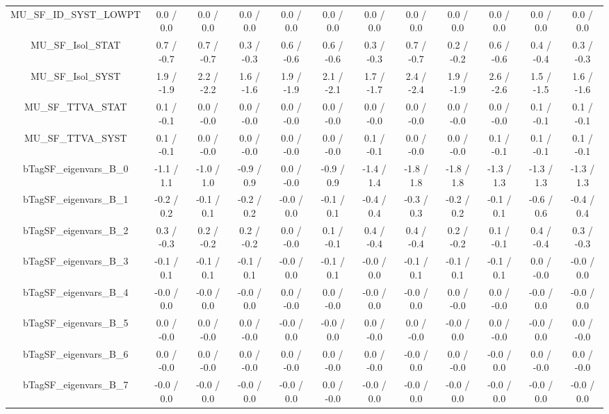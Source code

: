 \begin{table}[htbp]
\begin{center}
\begin{tabular}{|c|c|c|c|c|c|c|c|c|c|c|c|}
  MU_SF_ID_SYST_LOWPT & 0.0 / 0.0 & 0.0 / 0.0 & 0.0 / 0.0 & 0.0 / 0.0 & 0.0 / 0.0 & 0.0 / 0.0 & 0.0 / 0.0 & 0.0 / 0.0 & 0.0 / 0.0 & 0.0 / 0.0 & 0.0 / 0.0 \\ 
  MU_SF_Isol_STAT & 0.7 / -0.7 & 0.7 / -0.7 & 0.3 / -0.3 & 0.6 / -0.6 & 0.6 / -0.6 & 0.3 / -0.3 & 0.7 / -0.7 & 0.2 / -0.2 & 0.6 / -0.6 & 0.4 / -0.4 & 0.3 / -0.3 \\ 
  MU_SF_Isol_SYST & 1.9 / -1.9 & 2.2 / -2.2 & 1.6 / -1.6 & 1.9 / -1.9 & 2.1 / -2.1 & 1.7 / -1.7 & 2.4 / -2.4 & 1.9 / -1.9 & 2.6 / -2.6 & 1.5 / -1.5 & 1.6 / -1.6 \\ 
  MU_SF_TTVA_STAT & 0.1 / -0.1 & 0.0 / -0.0 & 0.0 / -0.0 & 0.0 / -0.0 & 0.0 / -0.0 & 0.0 / -0.0 & 0.0 / -0.0 & 0.0 / -0.0 & 0.0 / -0.0 & 0.1 / -0.1 & 0.1 / -0.1 \\ 
  MU_SF_TTVA_SYST & 0.1 / -0.1 & 0.0 / -0.0 & 0.0 / -0.0 & 0.0 / -0.0 & 0.0 / -0.0 & 0.1 / -0.1 & 0.0 / -0.0 & 0.0 / -0.0 & 0.1 / -0.1 & 0.1 / -0.1 & 0.1 / -0.1 \\ 
  bTagSF_eigenvars_B_0 & -1.1 / 1.1 & -1.0 / 1.0 & -0.9 / 0.9 & 0.0 / -0.0 & -0.9 / 0.9 & -1.4 / 1.4 & -1.8 / 1.8 & -1.8 / 1.8 & -1.3 / 1.3 & -1.3 / 1.3 & -1.3 / 1.3 \\ 
  bTagSF_eigenvars_B_1 & -0.2 / 0.2 & -0.1 / 0.1 & -0.2 / 0.2 & -0.0 / 0.0 & -0.1 / 0.1 & -0.4 / 0.4 & -0.3 / 0.3 & -0.2 / 0.2 & -0.1 / 0.1 & -0.6 / 0.6 & -0.4 / 0.4 \\ 
  bTagSF_eigenvars_B_2 & 0.3 / -0.3 & 0.2 / -0.2 & 0.2 / -0.2 & 0.0 / -0.0 & 0.1 / -0.1 & 0.4 / -0.4 & 0.4 / -0.4 & 0.2 / -0.2 & 0.1 / -0.1 & 0.4 / -0.4 & 0.3 / -0.3 \\ 
  bTagSF_eigenvars_B_3 & -0.1 / 0.1 & -0.1 / 0.1 & -0.1 / 0.1 & -0.0 / 0.0 & -0.1 / 0.1 & -0.0 / 0.0 & -0.1 / 0.1 & -0.1 / 0.1 & -0.1 / 0.1 & 0.0 / -0.0 & -0.0 / 0.0 \\ 
  bTagSF_eigenvars_B_4 & -0.0 / 0.0 & -0.0 / 0.0 & -0.0 / 0.0 & 0.0 / -0.0 & 0.0 / -0.0 & -0.0 / 0.0 & -0.0 / 0.0 & 0.0 / -0.0 & 0.0 / -0.0 & -0.0 / 0.0 & -0.0 / 0.0 \\ 
  bTagSF_eigenvars_B_5 & 0.0 / -0.0 & 0.0 / -0.0 & 0.0 / -0.0 & -0.0 / 0.0 & -0.0 / 0.0 & 0.0 / -0.0 & 0.0 / -0.0 & -0.0 / 0.0 & 0.0 / -0.0 & -0.0 / 0.0 & 0.0 / -0.0 \\ 
  bTagSF_eigenvars_B_6 & 0.0 / -0.0 & 0.0 / -0.0 & 0.0 / -0.0 & 0.0 / -0.0 & 0.0 / -0.0 & 0.0 / -0.0 & -0.0 / 0.0 & 0.0 / -0.0 & -0.0 / 0.0 & 0.0 / -0.0 & 0.0 / -0.0 \\ 
  bTagSF_eigenvars_B_7 & -0.0 / 0.0 & -0.0 / 0.0 & -0.0 / 0.0 & -0.0 / 0.0 & 0.0 / -0.0 & -0.0 / 0.0 & -0.0 / 0.0 & -0.0 / 0.0 & -0.0 / 0.0 & -0.0 / 0.0 & -0.0 / 0.0 \\ 

\end{tabular}
\end{center}
\end{table}
